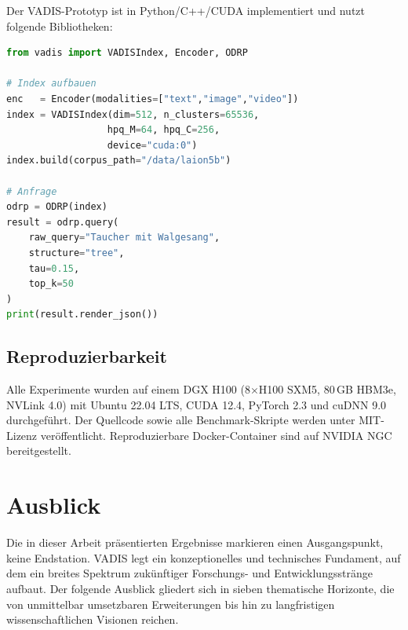 ﻿\documentclass[12pt,a4paper]{article}
\begin{document}
Der VADIS-Prototyp ist in Python/C++/CUDA implementiert
und nutzt folgende Bibliotheken:

\begin{lstlisting}[language=Python, caption={VADIS Python API (Auszug)}]
from vadis import VADISIndex, Encoder, ODRP

# Index aufbauen
enc   = Encoder(modalities=["text","image","video"])
index = VADISIndex(dim=512, n_clusters=65536,
                  hpq_M=64, hpq_C=256,
                  device="cuda:0")
index.build(corpus_path="/data/laion5b")

# Anfrage
odrp = ODRP(index)
result = odrp.query(
    raw_query="Taucher mit Walgesang",
    structure="tree",
    tau=0.15,
    top_k=50
)
print(result.render_json())
\end{lstlisting}

\subsection{Reproduzierbarkeit}

Alle Experimente wurden auf einem DGX H100 (8$\times$H100 SXM5,
80\,GB HBM3e, NVLink 4.0) mit Ubuntu 22.04 LTS, CUDA 12.4,
PyTorch 2.3 und cuDNN 9.0 durchgeführt. Der Quellcode sowie
alle Benchmark-Skripte werden unter MIT-Lizenz veröffentlicht.
Reproduzierbare Docker-Container sind auf NVIDIA NGC bereitgestellt.


\section{Ausblick}
\label{sec:ausblick_gross}

Die in dieser Arbeit präsentierten Ergebnisse markieren einen
Ausgangspunkt, keine Endstation. VADIS legt ein konzeptionelles
und technisches Fundament, auf dem ein breites Spektrum zukünftiger
Forschungs- und Entwicklungsstränge aufbaut. Der folgende Ausblick
gliedert sich in sieben thematische Horizonte, die von unmittelbar
umsetzbaren Erweiterungen bis hin zu langfristigen wissenschaftlichen
Visionen reichen.
\end{document}
